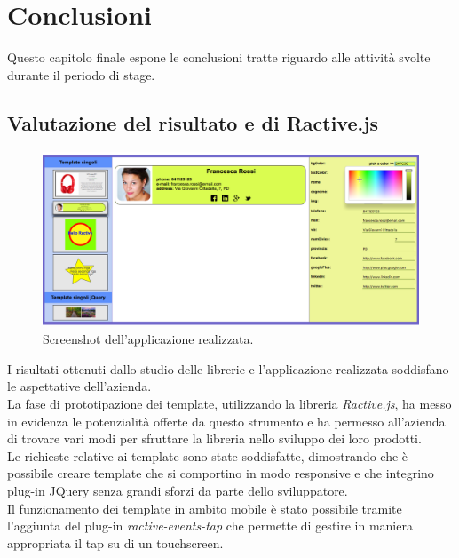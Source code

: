
\chapter{Conclusioni}
\label{cap:conclusioni}

Questo capitolo finale espone le conclusioni tratte riguardo alle attività svolte durante il periodo di stage.

\section{Valutazione del risultato e di Ractive.js}
\begin{figure}[htp]
	\centering
	\includegraphics[scale=0.31]{../immagini/screenshot_app}
	\caption{Screenshot dell'applicazione realizzata.}
\end{figure}
I risultati ottenuti dallo studio delle librerie e l'applicazione realizzata soddisfano le aspettative dell'azienda.\\
La fase di prototipazione dei template, utilizzando la libreria \textit{Ractive.js}, ha messo in evidenza le potenzialità offerte da questo strumento e ha permesso all'azienda di trovare vari modi per sfruttare la libreria nello sviluppo dei loro prodotti.\\
Le richieste relative ai template sono state soddisfatte, dimostrando che è possibile creare template che si comportino in modo responsive e che integrino plug-in JQuery senza grandi sforzi da parte dello sviluppatore.\\
Il funzionamento dei template in ambito mobile è stato possibile tramite l'aggiunta del plug-in \textit{ractive-events-tap} che permette di gestire in maniera appropriata il tap su di un touchscreen.\\
